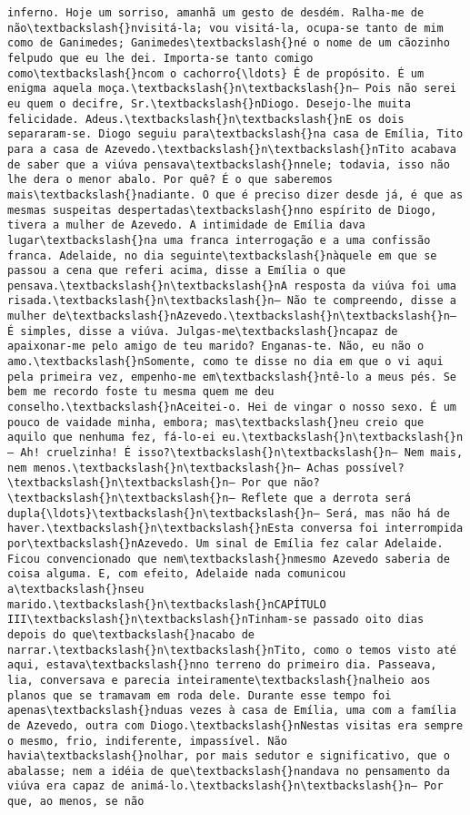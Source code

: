 \documentclass[11pt]{article}
\begin{document}
\begin{Verbatim}[commandchars=\\\{\}]
inferno. Hoje um sorriso, amanhã um gesto de desdém. Ralha-me de não\textbackslash{}nvisitá-la; vou visitá-la, ocupa-se tanto de mim como de Ganimedes; Ganimedes\textbackslash{}né o nome de um cãozinho felpudo que eu lhe dei. Importa-se tanto comigo como\textbackslash{}ncom o cachorro{\ldots} É de propósito. É um enigma aquela moça.\textbackslash{}n\textbackslash{}n— Pois não serei eu quem o decifre, Sr.\textbackslash{}nDiogo. Desejo-lhe muita felicidade. Adeus.\textbackslash{}n\textbackslash{}nE os dois separaram-se. Diogo seguiu para\textbackslash{}na casa de Emília, Tito para a casa de Azevedo.\textbackslash{}n\textbackslash{}nTito acabava de saber que a viúva pensava\textbackslash{}nnele; todavia, isso não lhe dera o menor abalo. Por quê? É o que saberemos mais\textbackslash{}nadiante. O que é preciso dizer desde já, é que as mesmas suspeitas despertadas\textbackslash{}nno espírito de Diogo, tivera a mulher de Azevedo. A intimidade de Emília dava lugar\textbackslash{}na uma franca interrogação e a uma confissão franca. Adelaide, no dia seguinte\textbackslash{}nàquele em que se passou a cena que referi acima, disse a Emília o que pensava.\textbackslash{}n\textbackslash{}nA resposta da viúva foi uma risada.\textbackslash{}n\textbackslash{}n— Não te compreendo, disse a mulher de\textbackslash{}nAzevedo.\textbackslash{}n\textbackslash{}n— É simples, disse a viúva. Julgas-me\textbackslash{}ncapaz de apaixonar-me pelo amigo de teu marido? Enganas-te. Não, eu não o amo.\textbackslash{}nSomente, como te disse no dia em que o vi aqui pela primeira vez, empenho-me em\textbackslash{}ntê-lo a meus pés. Se bem me recordo foste tu mesma quem me deu conselho.\textbackslash{}nAceitei-o. Hei de vingar o nosso sexo. É um pouco de vaidade minha, embora; mas\textbackslash{}neu creio que aquilo que nenhuma fez, fá-lo-ei eu.\textbackslash{}n\textbackslash{}n— Ah! cruelzinha! É isso?\textbackslash{}n\textbackslash{}n— Nem mais, nem menos.\textbackslash{}n\textbackslash{}n— Achas possível?\textbackslash{}n\textbackslash{}n— Por que não?\textbackslash{}n\textbackslash{}n— Reflete que a derrota será dupla{\ldots}\textbackslash{}n\textbackslash{}n— Será, mas não há de haver.\textbackslash{}n\textbackslash{}nEsta conversa foi interrompida por\textbackslash{}nAzevedo. Um sinal de Emília fez calar Adelaide. Ficou convencionado que nem\textbackslash{}nmesmo Azevedo saberia de coisa alguma. E, com efeito, Adelaide nada comunicou a\textbackslash{}nseu marido.\textbackslash{}n\textbackslash{}nCAPÍTULO III\textbackslash{}n\textbackslash{}nTinham-se passado oito dias depois do que\textbackslash{}nacabo de narrar.\textbackslash{}n\textbackslash{}nTito, como o temos visto até aqui, estava\textbackslash{}nno terreno do primeiro dia. Passeava, lia, conversava e parecia inteiramente\textbackslash{}nalheio aos planos que se tramavam em roda dele. Durante esse tempo foi apenas\textbackslash{}nduas vezes à casa de Emília, uma com a família de Azevedo, outra com Diogo.\textbackslash{}nNestas visitas era sempre o mesmo, frio, indiferente, impassível. Não havia\textbackslash{}nolhar, por mais sedutor e significativo, que o abalasse; nem a idéia de que\textbackslash{}nandava no pensamento da viúva era capaz de animá-lo.\textbackslash{}n\textbackslash{}n— Por que, ao menos, se não 
\end{Verbatim}
\end{document}
